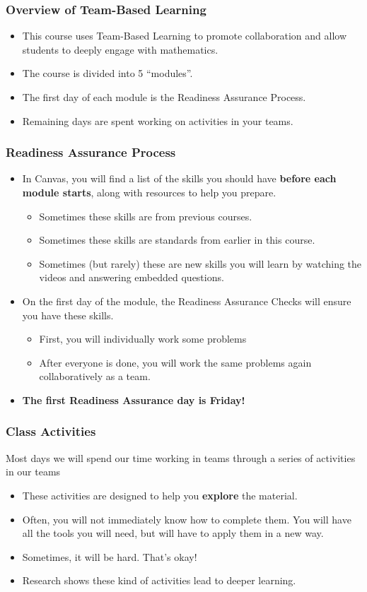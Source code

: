 \documentclass[aspectration=1610]{beamer}
\begin{document}
  \begin{frame}\frametitle{Overview of Team-Based Learning}
  \begin{itemize}
  \item This course uses Team-Based Learning to promote collaboration and allow students to deeply engage with mathematics.
  \item The course is divided into 5 ``modules''.
  \item The first day of each module is the Readiness Assurance Process.
  \item Remaining days are spent working on activities in your teams.
  \end{itemize}
  \end{frame}

  \begin{frame}\frametitle{Readiness Assurance Process}
  \begin{itemize}
  \item In Canvas, you will find a list of the skills you should have {\bf before each module starts}, along with resources to help you prepare.
  \begin{itemize}
  \item Sometimes these skills are from previous courses.
  \item Sometimes these skills are standards from earlier in this course.
    \item Sometimes (but rarely) these are new skills you will learn by watching the videos and answering embedded questions.
  \end{itemize}
  \pause \item On the first day of the module, the Readiness Assurance Checks will ensure you have these skills.
  \begin{itemize}
  \item First, you will individually work some problems
  \item After everyone is done, you will work the same problems again collaboratively as a team.
  \end{itemize}
  \item {\bf The first Readiness Assurance day is Friday!}
  \end{itemize}
  \end{frame}
  
  
\begin{frame}\frametitle{Class Activities}
Most days we will spend our time working in teams through a series of activities in our teams
\begin{itemize}
\item These activities are designed to help you \textbf{explore} the material.
\item Often, you will not immediately know how to complete them.  You will have all the tools you will need, but will have to apply them in a new way.
\item Sometimes, it will be hard.  That's okay!
\item Research shows these kind of activities lead to deeper learning.
\end{itemize}

\end{frame}
\end{document}
